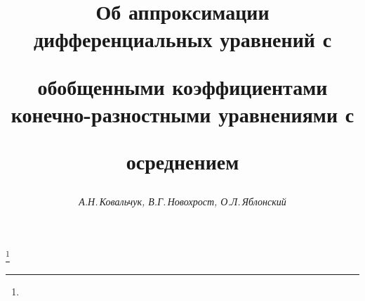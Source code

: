 









\newcommand{\maxtt}{\max\begin{Sb} t_1,t_2\in T\\ [t_1,t_2]\le 1/n\end{Sb}}


\newcommand{\var}{\operatornamewithlimits{var}}


\newcommand{\tts}[1]{}









\setcounter{page}{23}















\author{\it А.Н.\,Ковальчук, В.Г.\,Новохрост, О.Л.\,Яблонский}




\title{Об аппроксимации дифференциальных уравнений с


обобщенными коэффициентами конечно-разностными уравнениями с


осреднением}


\thanks{}





\date{}




\pagestyle{plain} %





